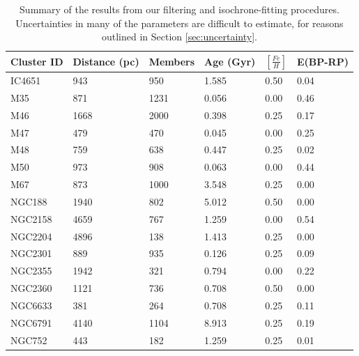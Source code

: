 \documentclass[onecolumn,table,xcdraw,super]{aastex631}
\begin{document}
\begin{table}[]
\centering
{}
\begin{tabular}{llllll}
\toprule
Cluster ID & Distance (pc) & Members & Age (Gyr) & $[\frac{Fe}{H}]$ & E(BP-RP) \\ \midrule
IC4651     & 943        & 950     & 1.585     & 0.50             & 0.04      \\
M35        & 871        & 1231    & 0.056     & 0.00             & 0.46      \\
M46        & 1668       & 2000    & 0.398     & 0.25             & 0.17      \\
M47        & 479        & 470     & 0.045     & 0.00             & 0.25      \\
M48        & 759        & 638     & 0.447     & 0.25             & 0.02      \\
M50        & 973        & 908     & 0.063     & 0.00             & 0.44      \\
M67        & 873        & 1000    & 3.548     & 0.25             & 0.00      \\
NGC188     & 1940       & 802     & 5.012     & 0.50             & 0.00      \\
NGC2158    & 4659       & 767     & 1.259     & 0.00             & 0.54      \\
NGC2204    & 4896       & 138     & 1.413     & 0.25             & 0.00      \\
NGC2301    & 889        & 935     & 0.126     & 0.25             & 0.09      \\
NGC2355    & 1942       & 321     & 0.794     & 0.00             & 0.22      \\
NGC2360    & 1121       & 736     & 0.708     & 0.50             & 0.00      \\
NGC6633    & 381        & 264     & 0.708     & 0.25             & 0.11      \\
NGC6791    & 4140       & 1104    & 8.913     & 0.25             & 0.19      \\
NGC752     & 443        & 182     & 1.259     & 0.25             & 0.01      \\ \bottomrule
\end{tabular}
\caption{Summary of the results from our filtering and isochrone-fitting procedures. Uncertainties in many of the parameters are difficult to estimate, for reasons outlined in Section \ref{sec:uncertainty}.}
\label{tab:fits}
\end{table}
\end{document}
